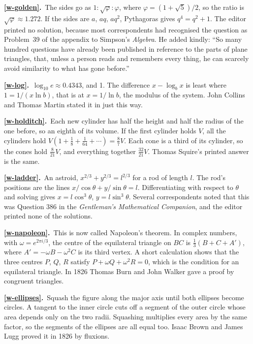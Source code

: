 \documentclass[11pt,a4paper]{article}
\newcommand{\ans}[2]{\par\smallskip\noindent\textbf{\ref{#1}.}\ #2}
\begin{document}
\ans{w-golden}{The sides go as $1 : \sqrt\varphi : \varphi$, where $\varphi = (1+\sqrt5)/2$,
so the ratio is $\sqrt\varphi \approx 1.272$. If the sides are $a$, $aq$, $aq^2$, Pythagoras
gives $q^4 = q^2 + 1$. The editor printed no solution, because most correspondents had
recognised the question as Problem~39 of the appendix to Simpson's \textit{Algebra}. He
added kindly: ``So many hundred questions have already been published in reference to the
parts of plane triangles, that, unless a person reads and remembers every thing, he can
scarcely avoid similarity to what has gone before.''}

\ans{w-log}{$\log_{10}e \approx 0.4343$, and 1. The difference $x - \log_b x$ is least
where $1 = 1/(x\ln b)$, that is at $x = 1/\ln b$, the modulus of the system. John Collins
and Thomas Martin stated it in just this way.}

\ans{w-holditch}{Each new cylinder has half the height and half the radius of the one
before, so an eighth of its volume. If the first cylinder holds $V$, all the cylinders
hold $V(1 + \tfrac18 + \tfrac1{64} + \cdots) = \tfrac87V$. Each cone is a third of its
cylinder, so the cones hold $\tfrac8{21}V$, and everything together $\tfrac{32}{21}V$.
Thomas Squire's printed answer is the same.}

\ans{w-ladder}{An astroid, $x^{2/3} + y^{2/3} = l^{2/3}$ for a rod of length $l$. The rod's
positions are the lines $x/\cos\theta + y/\sin\theta = l$. Differentiating with respect
to $\theta$ and solving gives $x = l\cos^3\theta$, $y = l\sin^3\theta$. Several
correspondents noted that this was Question 386 in the \textit{Gentleman's Mathematical
Companion}, and the editor printed none of the solutions.}

\ans{w-napoleon}{This is now called Napoleon's theorem. In complex numbers, with
$\omega = e^{2\pi i/3}$, the centre of the equilateral triangle on $BC$ is
$\tfrac13(B + C + A')$, where $A' = -\omega B - \omega^2C$ is its third vertex. A short
calculation shows that the three centres $P$, $Q$, $R$ satisfy
$P + \omega Q + \omega^2R = 0$, which is the condition for an equilateral triangle.
In 1826 Thomas Burn and John Walker gave a proof by congruent triangles.}

\ans{w-ellipses}{Squash the figure along the major axis until both ellipses become
circles. A tangent to the inner circle cuts off a segment of the outer circle whose area
depends only on the two radii. Squashing multiplies every area by the same factor, so the
segments of the ellipses are all equal too. Isaac Brown and James Lugg proved it in 1826
by fluxions.}
\end{document}
